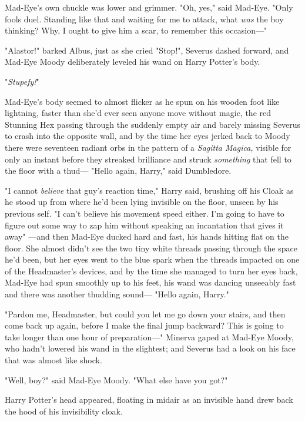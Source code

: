 Mad-Eye's own chuckle was lower and grimmer. "Oh, yes," said Mad-Eye. "Only
fools duel. Standing like that and waiting for me to attack, what \emph{was}
the boy thinking? Why, I ought to give him a scar, to remember this occasion\mbox{---}"

"Alastor!" barked Albus, just as she cried "Stop!", Severus dashed forward, and
Mad-Eye Moody deliberately leveled his wand on Harry Potter's body.

"\emph{Stupefy!}"

Mad-Eye's body seemed to almost flicker as he spun on his wooden foot like
lightning, faster than she'd ever seen anyone move without magic, the red
Stunning Hex passing through the suddenly empty air and barely missing Severus
to crash into the opposite wall, and by the time her eyes jerked back to Moody
there were seventeen radiant orbs in the pattern of a \emph{Sagitta Magica,}
visible for only an instant before they streaked brilliance and struck
\emph{something} that fell to the floor with a thud---
\sbreak
"Hello again, Harry," said Dumbledore.

"I cannot \emph{believe} that guy's reaction time," Harry said, brushing off
his Cloak as he stood up from where he'd been lying invisible on the floor,
unseen by his previous self. "I can't believe his movement speed either. I'm
going to have to figure out some way to zap him without speaking an incantation
that gives it away{\el}"
\sbreak
---and then Mad-Eye ducked hard and fast, his hands hitting flat on the floor.
She almost didn't see the two tiny white threads passing through the space he'd
been, but her eyes went to the blue spark when the threads impacted on one of
the Headmaster's devices, and by the time she managed to turn her eyes back,
Mad-Eye had spun smoothly up to his feet, his wand was dancing unseeably fast
and there was another thudding sound---
\sbreak
"Hello again, Harry."

"Pardon me, Headmaster, but could you let me go down your stairs, and then come
back up again, before I make the final jump backward? This is going to take
longer than one hour of preparation\mbox{---}"
\sbreak
Minerva gaped at Mad-Eye Moody, who hadn't lowered his wand in the slightest;
and Severus had a look on his face that was almost like shock.

"Well, boy?" said Mad-Eye Moody. "What else have you got?"

Harry Potter's head appeared, floating in midair as an invisible hand drew back
the hood of his invisibility cloak.

